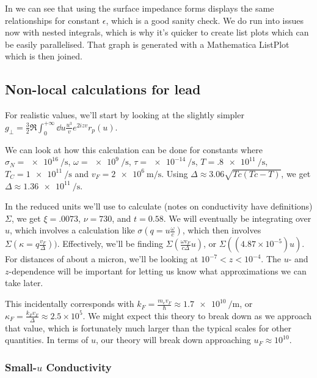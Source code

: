 \documentclass[../main.tex]{subfiles}
\begin{document}
	In  we can see that using the surface impedance forms displays the same relationships for constant $\epsilon$, which is a good sanity check.
	We do run into issues now with nested integrals, which is why it's quicker to create list plots which can be easily parallelised.
	That graph is generated with a Mathematica ListPlot which is then joined.

	\subsection{Non-local calculations for lead} \label{subsec:sample:namresult}

	For realistic values, we'll start by looking at the slightly simpler $g_\perp = \frac32 \Re \int_0^{+\infty} \dd{u} \frac{u^3}{v} e^{2 i z v} r_p(u)$.

	We can look at how this calculation can be done for constants where $\sigma_N = \SI{e16}{\per\second}$, $\omega = \SI{e9}{\per\second}$, $\tau = \SI{e-14}{\per\second}$, $T = \SI{.8e11}{\per\second}$, $T_C = \SI{1e11}{\per\second}$ and $v_F = \SI{2e6}{\m\per\s}$.
	Using $\Delta \approx 3.06 \sqrt{Tc(Tc - T)}$, we get $\Delta \approx \SI{1.36e11}{\per\second}$.

	In the reduced units we'll use to calculate (notes on conductivity have definitions) $\Sigma$, we get $\xi = .0073$, $\nu = 730$, and $t = 0.58$.
	We will eventually be integrating over $u$, which involves a calculation like $\sigma\left(q = u \frac{\omega}{c}\right)$, which then involves $\Sigma\left(\kappa = q \frac{v_F}{\Delta}\right))$.
	Effectively, we'll be finding $\Sigma\left(\frac{\omega v_F}{c \Delta} u\right)$, or $\Sigma\left(\left( 4.87 \times 10^{-5} \right) u \right)$.
	For distances of about a micron, we'll be looking at $10^{-7} < z < 10^{-4}$.
	The $u$- and $z$-dependence will be important for letting us know what approximations we can take later.

	This incidentally corresponds with $k_F = \frac{m_e v_F}{\hbar} \approx \SI{1.7e10}{\per\meter}$, or $\kappa_F = \frac{k_F v_F}{\Delta} \approx 2.5 \times 10^5$.
	We might expect this theory to break down as we approach that value, which is fortunately much larger than the typical scales for other quantities.
	In terms of $u$, our theory will break down approaching $u_F \approx 10^{10}$.

	\subsubsection{Small-$u$ Conductivity} \label{subsubsec:smallucond}
\end{document}
